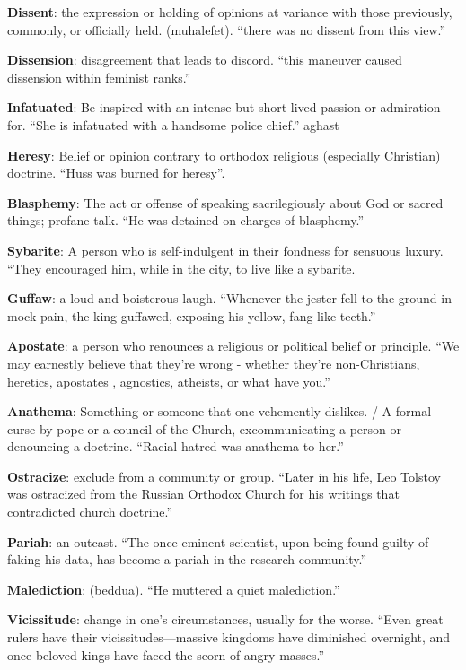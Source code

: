 \documentclass[12pt, a4paper]{ximera}
\begin{document}
\textbf{Dissent}: the expression or holding of opinions at variance with those previously, commonly, or officially held. (muhalefet). ``there was no dissent from this view.''

\textbf{Dissension}: disagreement that leads to discord. ``this maneuver caused dissension within feminist ranks.''

\textbf{Infatuated}: Be inspired with an intense but short-lived passion or admiration for. ``She is infatuated with a handsome police chief.''
aghast

\textbf{Heresy}: Belief or opinion contrary to orthodox religious (especially Christian) doctrine. ``Huss was burned for heresy''. 

\textbf{Blasphemy}: The act or offense of speaking sacrilegiously about God or sacred things; profane talk. ``He was detained on charges of blasphemy.''

\textbf{Sybarite}: A person who is self-indulgent in their fondness for sensuous luxury. ``They encouraged him, while in the city, to live like a sybarite.

\textbf{Guffaw}: a loud and boisterous laugh. ``Whenever the jester fell to the ground in mock pain, the king guffawed, exposing his yellow, fang-like teeth.''

\textbf{Apostate}: a person who renounces a religious or political belief or principle. ``We may earnestly believe that they're wrong - whether they're non-Christians, heretics, apostates , agnostics, atheists, or what have you.''

\textbf{Anathema}: Something or someone that one vehemently dislikes. / A formal curse by pope or a council of the Church, excommunicating a person or denouncing a doctrine. ``Racial hatred was anathema to her.''

\textbf{Ostracize}: exclude from a community or group. ``Later in his life, Leo Tolstoy was ostracized from the Russian Orthodox Church for his writings that contradicted church doctrine.''

\textbf{Pariah}: an outcast. ``The once eminent scientist, upon being found guilty of faking his data, has become a pariah in the research community.''

\textbf{Malediction}: (beddua). ``He muttered a quiet malediction.''

\textbf{Vicissitude}: change in one’s circumstances, usually for the worse. ``Even great rulers have their vicissitudes—massive kingdoms have diminished overnight, and once beloved kings have faced the scorn of angry masses.''
\end{document}
